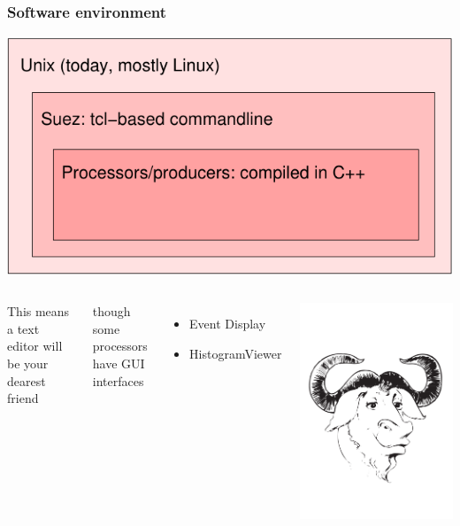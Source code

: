 \documentclass[12pt,compress]{beamer}
\begin{document}
\begin{frame}
\frametitle{Software environment}

\begin{center}
\includegraphics[width=0.7\linewidth]{environment}
\end{center}

\vfill
\begin{columns}
This means a text editor will be your dearest friend

\vspace{0.25 cm}
though some processors have GUI interfaces
\begin{itemize}
\item Event Display
\item HistogramViewer
\end{itemize}

\includegraphics[width=\linewidth]{gnu-head.pdf}
\end{columns}
\end{frame}
\end{document}
